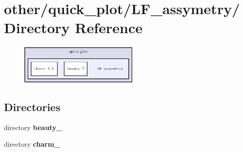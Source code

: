 \section{other/quick\_\-plot/LF\_\-assymetry/ Directory Reference}
\label{dir_e6b06dabd0dbf00c233c18a6987f7858}


\begin{figure}[H]
\begin{center}
\leavevmode
\includegraphics[width=169pt]{dir_e6b06dabd0dbf00c233c18a6987f7858_dep}
\end{center}
\end{figure}
\subsection*{Directories}
\begin{CompactItemize}
\item 
directory \bf{beauty\_}
\item 
directory \bf{charm\_}
\end{CompactItemize}
